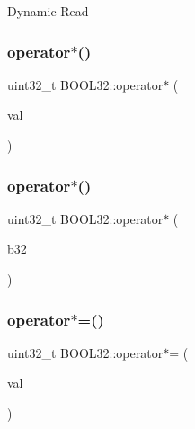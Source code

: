 Dynamic Read \hypertarget{struct_b_o_o_l32_ae8ce040f2975c8bb51c8a93289a54dd3}{}\label{struct_b_o_o_l32_ae8ce040f2975c8bb51c8a93289a54dd3} 
\subsubsection{\texorpdfstring{operator$\ast$()}{operator*()}\hspace{0.1cm}{\footnotesize\ttfamily [1/2]}}
{\footnotesize\ttfamily uint32\+\_\+t B\+O\+O\+L32\+::operator$\ast$ (\begin{DoxyParamCaption}\item[{const uint32\+\_\+t}]{val }\end{DoxyParamCaption})\hspace{0.3cm}{\ttfamily [inline]}}

\hypertarget{struct_b_o_o_l32_ae05d59f2c1aa44faeda63f93d8f1ec92}{}\label{struct_b_o_o_l32_ae05d59f2c1aa44faeda63f93d8f1ec92} 
\subsubsection{\texorpdfstring{operator$\ast$()}{operator*()}\hspace{0.1cm}{\footnotesize\ttfamily [2/2]}}
{\footnotesize\ttfamily uint32\+\_\+t B\+O\+O\+L32\+::operator$\ast$ (\begin{DoxyParamCaption}\item[{const \hyperlink{struct_b_o_o_l32}{B\+O\+O\+L32}}]{b32 }\end{DoxyParamCaption})\hspace{0.3cm}{\ttfamily [inline]}}

\hypertarget{struct_b_o_o_l32_a84c538fdd716cefd16b143e1c9db9f44}{}\label{struct_b_o_o_l32_a84c538fdd716cefd16b143e1c9db9f44} 
\subsubsection{\texorpdfstring{operator$\ast$=()}{operator*=()}\hspace{0.1cm}{\footnotesize\ttfamily [1/2]}}
{\footnotesize\ttfamily uint32\+\_\+t B\+O\+O\+L32\+::operator$\ast$= (\begin{DoxyParamCaption}\item[{const uint32\+\_\+t}]{val }\end{DoxyParamCaption})\hspace{0.3cm}{\ttfamily [inline]}}

